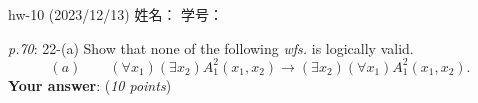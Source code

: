 \documentclass[UTF8,12pt,a4paper]{ctexart}
\begin{document}
	

\begin{center}
hw-10 (2023/12/13) \qquad\qquad 姓名：  \hspace{7em}  学号： 
\end{center}

\emph{p.70}: 22-(a) \quad
Show that none of the following \textit{wfs.} is logically valid.
\[
(a) \qquad 
(\forall x_1) (\exists x_2) A^2_1(x_1,x_2) \to (\exists x_2) (\forall x_1) A^2_1 (x_1,x_2).
\]
\textbf{Your answer}:   \hfill (\textit{10 points})


























\end{document}
